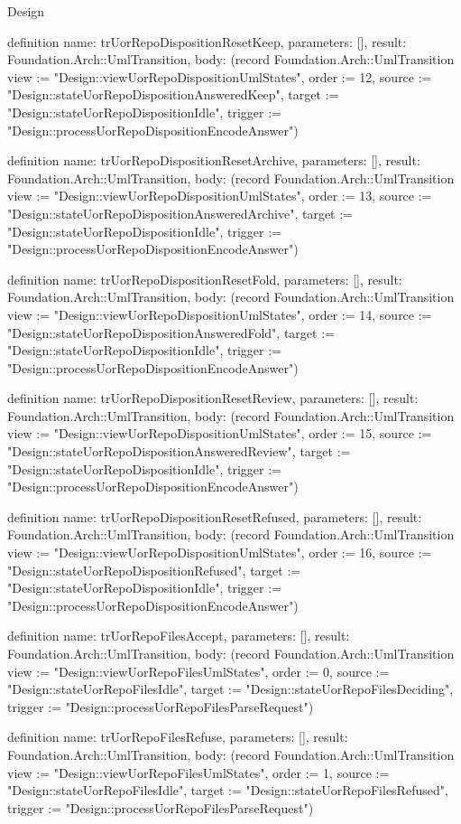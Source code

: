 \begin{lexlean}{Design}
\begin{semanticmodule}
definition{
  name: trUorRepoDispositionResetKeep,
  parameters: [],
  result: Foundation.Arch::UmlTransition,
  body: (record Foundation.Arch::UmlTransition {view := "Design::viewUorRepoDispositionUmlStates", order := 12, source := "Design::stateUorRepoDispositionAnsweredKeep", target := "Design::stateUorRepoDispositionIdle", trigger := "Design::processUorRepoDispositionEncodeAnswer"})
}

definition{
  name: trUorRepoDispositionResetArchive,
  parameters: [],
  result: Foundation.Arch::UmlTransition,
  body: (record Foundation.Arch::UmlTransition {view := "Design::viewUorRepoDispositionUmlStates", order := 13, source := "Design::stateUorRepoDispositionAnsweredArchive", target := "Design::stateUorRepoDispositionIdle", trigger := "Design::processUorRepoDispositionEncodeAnswer"})
}

definition{
  name: trUorRepoDispositionResetFold,
  parameters: [],
  result: Foundation.Arch::UmlTransition,
  body: (record Foundation.Arch::UmlTransition {view := "Design::viewUorRepoDispositionUmlStates", order := 14, source := "Design::stateUorRepoDispositionAnsweredFold", target := "Design::stateUorRepoDispositionIdle", trigger := "Design::processUorRepoDispositionEncodeAnswer"})
}

definition{
  name: trUorRepoDispositionResetReview,
  parameters: [],
  result: Foundation.Arch::UmlTransition,
  body: (record Foundation.Arch::UmlTransition {view := "Design::viewUorRepoDispositionUmlStates", order := 15, source := "Design::stateUorRepoDispositionAnsweredReview", target := "Design::stateUorRepoDispositionIdle", trigger := "Design::processUorRepoDispositionEncodeAnswer"})
}

definition{
  name: trUorRepoDispositionResetRefused,
  parameters: [],
  result: Foundation.Arch::UmlTransition,
  body: (record Foundation.Arch::UmlTransition {view := "Design::viewUorRepoDispositionUmlStates", order := 16, source := "Design::stateUorRepoDispositionRefused", target := "Design::stateUorRepoDispositionIdle", trigger := "Design::processUorRepoDispositionEncodeAnswer"})
}

definition{
  name: trUorRepoFilesAccept,
  parameters: [],
  result: Foundation.Arch::UmlTransition,
  body: (record Foundation.Arch::UmlTransition {view := "Design::viewUorRepoFilesUmlStates", order := 0, source := "Design::stateUorRepoFilesIdle", target := "Design::stateUorRepoFilesDeciding", trigger := "Design::processUorRepoFilesParseRequest"})
}

definition{
  name: trUorRepoFilesRefuse,
  parameters: [],
  result: Foundation.Arch::UmlTransition,
  body: (record Foundation.Arch::UmlTransition {view := "Design::viewUorRepoFilesUmlStates", order := 1, source := "Design::stateUorRepoFilesIdle", target := "Design::stateUorRepoFilesRefused", trigger := "Design::processUorRepoFilesParseRequest"})
}


\end{semanticmodule}
\end{lexlean}
